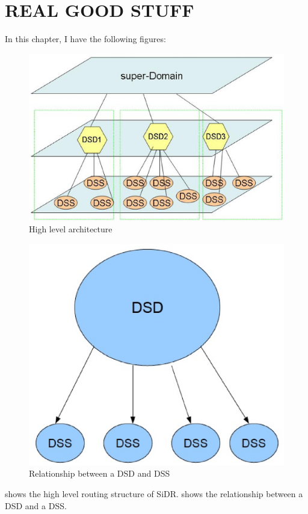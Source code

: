 \chapter{\uppercase{Real Good Stuff}}


In this chapter, I have the following figures:

\begin{figure}
  \center
  \includegraphics[scale=0.3]{figures/arch.eps}
  \caption{High level architecture}\label{chap2:fig1}
\end{figure}


\begin{figure}
  \center
  \includegraphics[scale=0.3]{figures/DSDDSS.eps}
  \caption{Relationship between a DSD and DSS}\label{chap2:fig2}
\end{figure}


  shows the high level routing structure of SiDR. 
 shows the relationship between a DSD and a DSS. 

